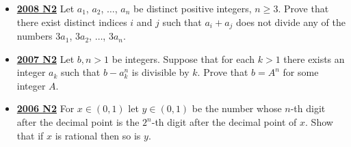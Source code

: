 \documentclass[11pt]{scrartcl}
\begin{document}
\begin{itemize}[leftmargin=*]
\begin{enumerate}[(a)]
    \item Prove that there exist distinct positive integers $a$ and $b$ such that all the number $P(1)$, $P(2)$,$\dots$, $P(50)$ are balanced.
    \item Prove that if $P(n)$ is balanced for all positive integers $n$, then $a=b$.
\end{enumerate}

\item \href{https://artofproblemsolving.com/community/c6h287870p1555929}{\textbf{2008 N2}} Let $ a_1$, $ a_2$, $ \dots$, $ a_n$ be distinct positive integers, $ n\geqslant  3$. Prove that there exist distinct indices $ i$ and $ j$ such that $ a_i + a_j$ does not divide any of the numbers $ 3a_1$, $ 3a_2$, $ \dots$, $ 3a_n$.
\item \href{https://artofproblemsolving.com/community/c6h214712p1187198}{\textbf{2007 N2}} 	Let $b,n > 1$ be integers. Suppose that for each $k > 1$ there exists an integer $a_k$ such that $b - a^n_k$ is divisible by $k$. Prove that $b = A^n$ for some integer $A$.
\item \href{https://artofproblemsolving.com/community/c6h155715p875055}{\textbf{2006 N2}} For $ x \in (0, 1)$ let $ y \in (0, 1)$ be the number whose $ n$-th digit after the decimal point is the $ 2^{n}$-th digit after the decimal point of $ x$. Show that if $ x$ is rational then so is $ y$.
\end{itemize}
\newpage
\end{document}
